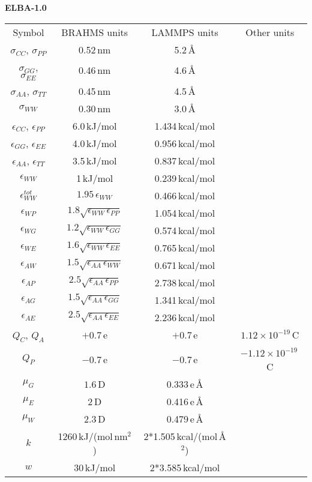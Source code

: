 \documentclass[10pt]{article}
\begin{document}
\large{
\bf{ELBA-1.0}}
\medskip
\begin{table*}[!ht]
\begin{tabular}{|c|c|c|c|}
Symbol & BRAHMS units & LAMMPS units & Other units \\
$\sigma_{CC}$, $\sigma_{PP}$ & 0.52\,nm & 5.2\,\AA&\\
$\sigma_{GG}$, $\sigma_{EE}$ & 0.46\,nm & 4.6\,\AA&\\
$\sigma_{AA}$, $\sigma_{TT}$ & 0.45\,nm & 4.5\,\AA&\\
$\sigma_{WW}$ & 0.30\,nm & 3.0\,\AA&\\
$\epsilon_{CC}$, $\epsilon_{PP}$ & 6.0\,kJ/mol & 1.434\,kcal/mol&\\
$\epsilon_{GG}$, $\epsilon_{EE}$ & 4.0\,kJ/mol & 0.956\,kcal/mol&\\
$\epsilon_{AA}$, $\epsilon_{TT}$  & 3.5\,kJ/mol & 0.837\,kcal/mol&\\
$\epsilon_{WW}$  & 1\,kJ/mol & 0.239\,kcal/mol&\\
$\epsilon^{tot}_{WW}$  & $1.95\,\epsilon_{WW}$ & 0.466\,kcal/mol&\\
$\epsilon_{WP}$ &$1.8\sqrt{\epsilon_{WW}\,\epsilon_{PP}} $ & 1.054\,kcal/mol&\\
$\epsilon_{WG}$ & $1.2\sqrt{\epsilon_{WW}\,\epsilon_{GG}} $ & 0.574\,kcal/mol&\\
$\epsilon_{WE}$  & $1.6\sqrt{\epsilon_{WW}\,\epsilon_{EE}} $ & 0.765\,kcal/mol&\\
$\epsilon_{AW}$  & $1.5\sqrt{\epsilon_{AA}\,\epsilon_{WW}} $ & 0.671\,kcal/mol&\\
$\epsilon_{AP}$  & $2.5\sqrt{\epsilon_{AA}\,\epsilon_{PP}} $ & 2.738\,kcal/mol&\\
$\epsilon_{AG}$  & $1.5\sqrt{\epsilon_{AA}\,\epsilon_{GG}} $ & 1.341\,kcal/mol&\\
$\epsilon_{AE}$  & $2.5\sqrt{\epsilon_{AA}\,\epsilon_{EE}} $ & 2.236\,kcal/mol&\\
 $Q_C$, $Q_A$   &$+0.7$\,e &$+0.7$\,e & $1.12\times10^{-19}$\,C\\
 $Q_P$  &$-0.7$\,e &$-0.7$\,e & $-1.12\times10^{-19}$\,C\\
 $\mu_G$ & $1.6$\,D & 0.333\,e\,\AA&\\
 $\mu_E$ & $2$\,D & 0.416\,e\,\AA&\\
 $\mu_W$ &$2.3$\,D & 0.479\,e\,\AA&\\
 $k$& 1260\,kJ/(mol\,nm$^{2}$)& 2*1.505\,kcal/(mol\,\AA$^2$)&\\
 $w$& 30\,kJ/mol& 2*3.585\,kcal/mol&\\

\end{tabular}
\end{table*}
\end{document}
